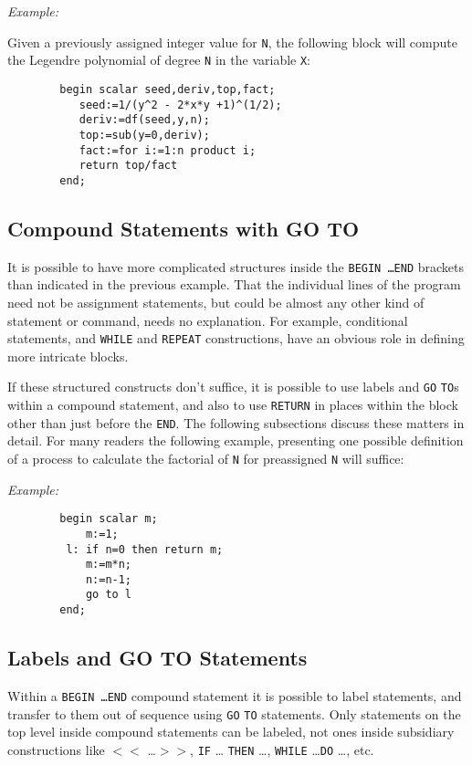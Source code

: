 {\it Example:}

Given a previously assigned integer value for {\tt N}, the following block
will compute the Legendre polynomial of degree {\tt N} in the variable
{\tt X}:
\begin{verbatim}
        begin scalar seed,deriv,top,fact;
           seed:=1/(y^2 - 2*x*y +1)^(1/2);
           deriv:=df(seed,y,n);
           top:=sub(y=0,deriv);
           fact:=for i:=1:n product i;
           return top/fact
        end;
\end{verbatim}

\subsection{Compound Statements with GO TO}

It is possible to have more complicated structures inside the {\tt BEGIN
\ldots END} brackets than indicated in the
previous example.  That the individual lines of the program need not be
assignment statements, but could be almost any other
kind of statement or command, needs no explanation.  For example,
conditional statements, and {\tt WHILE} and {\tt REPEAT}
 constructions, have an obvious role in defining more
intricate blocks.

If these structured constructs don't suffice, it is possible to use labels
 and {\tt GO} {\tt TO}s within a compound
statement, and also to use {\tt RETURN}
 in places within the block other than just before the
{\tt END}.  The following subsections discuss these matters in detail.
For many readers the following example, presenting one possible definition
of a process to calculate the factorial of {\tt N} for preassigned {\tt N}
will suffice:

{\it Example:}
\begin{verbatim}
        begin scalar m;
            m:=1;
         l: if n=0 then return m;
            m:=m*n;
            n:=n-1;
            go to l
        end;
\end{verbatim}

\subsection{Labels and GO TO Statements}

Within a {\tt BEGIN \ldots END} compound
statement it is possible to label statements, and transfer to them out of
sequence using {\tt GO} {\tt TO} statements.  Only statements on the top
level inside compound statements can be labeled, not ones inside
subsidiary constructions like {\tt $<<$} \ldots {\tt $>>$}, {\tt IF} \ldots
{\tt THEN} \ldots , {\tt WHILE} \ldots {\tt DO} \ldots , etc.


